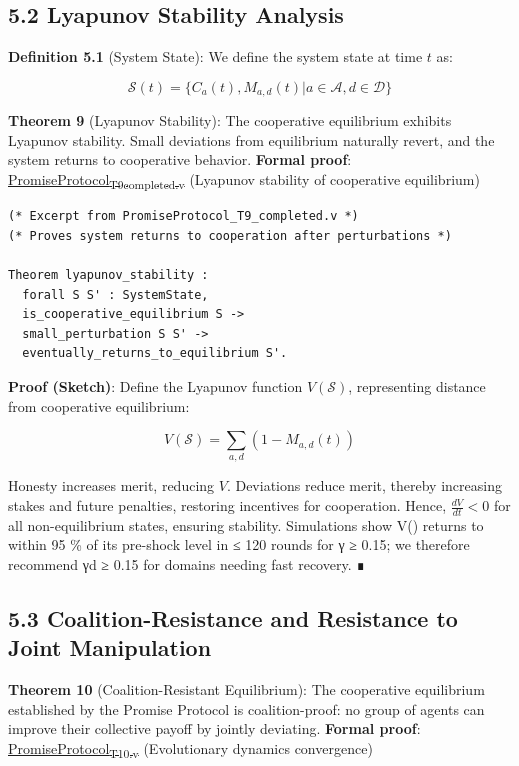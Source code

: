 \documentclass[11pt]{article}
\begin{document}
\subsection{5.2 Lyapunov Stability Analysis}
\label{sec:org7dd0755}

\textbf{Definition 5.1} (System State):
We define the system state at time \(t\) as:

\[
\mathcal{S}(t) = \{C_a(t), M_{a,d}(t) | a \in \mathcal{A}, d \in \mathcal{D}\}
\]

\textbf{Theorem 9} (Lyapunov Stability):
The cooperative equilibrium exhibits Lyapunov stability. Small deviations from equilibrium naturally revert, and the system returns to cooperative behavior.
\textbf{Formal proof}: \href{../coq/PromiseProtocol\_T9\_completed.v}{PromiseProtocol\textsubscript{T9}\textsubscript{completed.v}} (Lyapunov stability of cooperative equilibrium)

\begin{verbatim}
(* Excerpt from PromiseProtocol_T9_completed.v *)
(* Proves system returns to cooperation after perturbations *)

Theorem lyapunov_stability :
  forall S S' : SystemState,
  is_cooperative_equilibrium S ->
  small_perturbation S S' ->
  eventually_returns_to_equilibrium S'.
\end{verbatim}

\textbf{Proof (Sketch)}:
Define the Lyapunov function \(V(\mathcal{S})\), representing distance from cooperative equilibrium:

\[
V(\mathcal{S}) = \sum_{a,d}(1 - M_{a,d}(t))
\]

Honesty increases merit, reducing \(V\). Deviations reduce merit, thereby increasing stakes and future penalties, restoring incentives for cooperation. Hence, \(\frac{dV}{dt} < 0\) for all non-equilibrium states, ensuring stability. Simulations show V() returns to within 95 \% of its pre-shock level in ≤ 120 rounds for γ ≥ 0.15; we therefore recommend γd ≥ 0.15 for domains needing fast recovery. ∎
\subsection{5.3 Coalition-Resistance and Resistance to Joint Manipulation}
\label{sec:orgbbdd243}

\textbf{Theorem 10} (Coalition-Resistant Equilibrium):
The cooperative equilibrium established by the Promise Protocol is coalition-proof: no group of agents can improve their collective payoff by jointly deviating.
\textbf{Formal proof}: \href{../coq/PromiseProtocol\_T10.v}{PromiseProtocol\textsubscript{T10.v}} (Evolutionary dynamics convergence)
\end{document}
